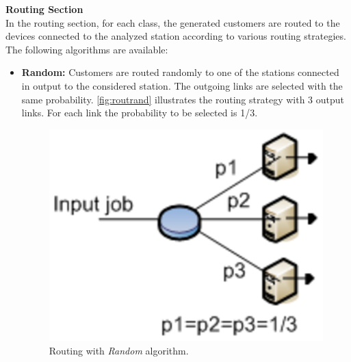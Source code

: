 \noindent \textbf{Routing Section}\\ In the routing section, for
each class, the generated customers are routed to the devices
connected to the analyzed station according to various routing
strategies. The following algorithms are available:
\begin{itemize}
\item \textbf{Random:} Customers are routed randomly to one of the
stations connected in output to the considered station. The
outgoing links are selected with the same probability. 
\autoref{fig:routrand} illustrates the routing strategy with 3 output
links. For each link the probability to be selected is 1/3.
\begin{figure}[htb]
    \begin{center}
        \includegraphics[scale=.5]{img/jsimg/8.7.eps}
    \end{center}
    \caption{Routing with \emph{Random} algorithm.}
    \label{fig:routrand}
\end{figure}


\end{itemize}
